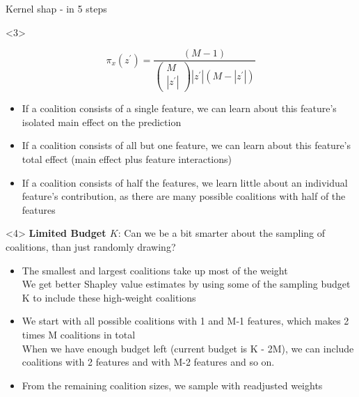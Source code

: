 \documentclass[11pt,compress,t,notes=noshow, aspectratio=169, xcolor=table]{beamer}
\begin{document}
\begin{vbframe}{Kernel shap - in 5 steps}
\begin{onlyenv}<3>

$$\pi_{x}\left(z^{\prime}\right)=\frac{(M-1)}{\left(\begin{array}{c} M \\\left|z^{\prime}\right|\end{array}\right)\left|z^{\prime}\right|\left(M-\left|z^{\prime}\right|\right)}$$

\begin{itemize}
    \item If a coalition consists of a single feature, we can learn about this feature’s isolated main effect on the prediction
    \item If a coalition consists of all but one feature, we can learn about this feature’s total effect (main effect plus feature interactions)
    \item If a coalition consists of half the features, we learn little about an individual feature’s contribution, as there are many possible coalitions with half of the features
\end{itemize}
\end{onlyenv}

\begin{onlyenv}<4>
\vspace{1cm}
\textbf{Limited Budget $K$}: Can we be a bit smarter about the sampling of coalitions, than just randomly drawing?
\begin{itemize}
    \item The smallest and largest coalitions take up most of the weight\\ We get better Shapley value estimates by using some of the sampling budget K to include these high-weight coalitions
    \item We start with all possible coalitions with 1 and M-1 features, which makes 2 times M coalitions in total\\ When we have enough budget left (current budget is K - 2M), we can include coalitions with 2 features and with M-2 features and so on.
    \item From the remaining coalition sizes, we sample with readjusted weights
\end{itemize}
\end{onlyenv}
  
\end{vbframe}
\end{document}
